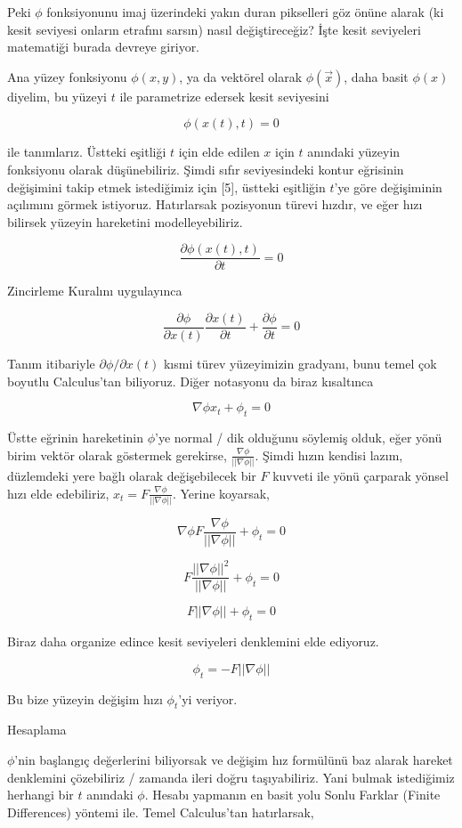 \documentclass[12pt,fleqn]{article}\usepackage{../../common}
\begin{document}
Peki $\phi$ fonksiyonunu imaj üzerindeki yakın duran pikselleri göz önüne alarak
(ki kesit seviyesi onların etrafını sarsın) nasıl değiştireceğiz? İşte kesit
seviyeleri matematiği burada devreye giriyor.

Ana yüzey fonksiyonu $\phi(x,y)$, ya da vektörel olarak $\phi(\vec{x})$, daha
basit $\phi(x)$ diyelim, bu yüzeyi $t$ ile parametrize edersek kesit seviyesini

$$
\phi(x(t), t) = 0
$$

ile tanımlarız. Üstteki eşitliği $t$ için elde edilen $x$ için $t$ anındaki
yüzeyin fonksiyonu olarak düşünebiliriz. Şimdi sıfır seviyesindeki kontur
eğrisinin değişimini takip etmek istediğimiz için [5], üstteki eşitliğin $t$'ye
göre değişiminin açılımını görmek istiyoruz. Hatırlarsak pozisyonun türevi
hızdır, ve eğer hızı bilirsek yüzeyin hareketini modelleyebiliriz.

$$
\frac{\partial \phi(x(t),t)}{\partial t} = 0
$$

Zincirleme Kuralını uygulayınca

$$
\frac{\partial \phi}{\partial x(t)} \frac{\partial x(t)}{\partial t} +
\frac{\partial \phi}{\partial t} = 0
$$

Tanım itibariyle $\partial \phi / \partial x(t)$ kısmi türev yüzeyimizin
gradyanı, bunu temel çok boyutlu Calculus'tan biliyoruz. Diğer notasyonu da
biraz kısaltınca

$$
\nabla \phi x_t + \phi_t = 0
$$

Üstte eğrinin hareketinin $\phi$'ye normal / dik olduğunu söylemiş olduk,
eğer yönü birim vektör olarak göstermek gerekirse, $\frac{\nabla \phi}{||\nabla \phi ||}$.
Şimdi hızın kendisi lazım, düzlemdeki yere bağlı olarak değişebilecek
bir $F$ kuvveti ile yönü çarparak yönsel hızı elde edebiliriz,
$x_t = F \frac{\nabla \phi}{||\nabla \phi ||} $. Yerine koyarsak,

$$
\nabla \phi F \frac{\nabla \phi}{||\nabla \phi ||}  + \phi_t = 0
$$

$$
F \frac{||\nabla \phi||^2}{||\nabla \phi ||}  + \phi_t = 0
$$

$$
F ||\nabla \phi||  + \phi_t = 0
$$

Biraz daha organize edince kesit seviyeleri denklemini elde ediyoruz.

$$
\phi_t = - F ||\nabla \phi|| 
$$

Bu bize yüzeyin değişim hızı $\phi_t$'yi veriyor.

Hesaplama

$\phi$'nin başlangıç değerlerini biliyorsak ve değişim hız formülünü baz alarak
hareket denklemini çözebiliriz / zamanda ileri doğru taşıyabiliriz. Yani bulmak
istediğimiz herhangi bir $t$ anındaki $\phi$. Hesabı yapmanın en basit yolu
Sonlu Farklar (Finite Differences) yöntemi ile.  Temel Calculus'tan hatırlarsak,
\end{document}
